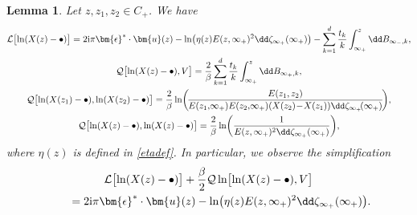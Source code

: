 \documentclass[10pt,a4paper]{amsart}
\numberwithin{equation}{section}
\newtheorem{Lemma}[Theorem]{Lemma}
\begin{document}
\begin{Lemma}
 \label{L44}
 Let $z,z_1,z_2 \in C_+$. We have
 \begin{gather*}
	 \mathcal{L}\bigl[\ln(X(z) - \bullet)\bigr]   = 2{\rm i}\pi\bm{\epsilon}^*\cdot\bm{u}(z) - \ln\bigl(\eta(z)E(z, \infty_{+})^2\dd\zeta_{\infty_{+}}(\infty_{+})\bigr) - \sum_{k = 1}^{d} \frac{t_k}{k} \int_{\infty_+}^{z} \dd B_{\infty_-,k}, \\
	 \mathcal{Q}\bigl[\ln(X(z) - \bullet),V\bigr]   = \frac{2}{\beta} \sum_{k = 1}^{d} \frac{t_k}{k} \int_{\infty_+}^{z} \dd B_{\infty_+,k}, \\
	 \mathcal{Q}\bigl[\ln(X(z_1) - \bullet), \ln(X(z_2) - \bullet)\bigr]   = \frac{2}{\beta}\ln \biggl(\!\frac{E(z_1, z_2)}{E(z_1,\!\infty_{+})E(z_2,\!\infty_+)(X(z_2) \!-\! X(z_1))\dd \zeta_{\infty_+}\!(\infty_+)}\!\biggr), \\
	 \mathcal{Q}\bigl[\ln(X(z) - \bullet),\ln(X(z) - \bullet)\bigr]   = \frac{2}{\beta}\ln\biggl(\frac{1}{E(z,\infty_+)^2\dd \zeta_{\infty_+}(\infty_+)}\biggr),
\end{gather*}
where $\eta(z)$ is defined in \eqref{etadef}. In particular, we
observe the simplification
\begin{gather} \nonumber
 \mathcal{L}\bigl[\ln(X(z) - \bullet)\bigr] + \frac{\beta}{2} \mathcal{Q}\ln\bigl[\ln(X(z) - \bullet),V\bigr] \\
 \qquad{}= 2{\rm i}\pi \bm{\epsilon}^{*} \cdot \bm{u}(z) - \ln\bigl(\eta(z)E(z, \infty_{+})^{2}\dd\zeta_{\infty_{+}}(\infty_{+})\bigr).\label{simplifLQ}
\end{gather}
\end{Lemma}
\end{document}
